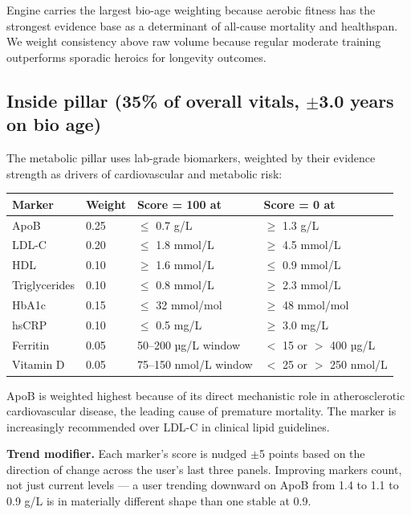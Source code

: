 \documentclass[11pt, a4paper]{article}
\begin{document}
Engine carries the largest bio-age weighting because aerobic fitness has the strongest evidence base as a determinant of all-cause mortality and healthspan. We weight consistency above raw volume because regular moderate training outperforms sporadic heroics for longevity outcomes.

\subsection{Inside pillar (35\% of overall vitals, $\pm$3.0 years on bio age)}

The metabolic pillar uses lab-grade biomarkers, weighted by their evidence strength as drivers of cardiovascular and metabolic risk:

\vspace{0.3em}
\noindent
\begin{tabularx}{\linewidth}{@{} L{2.5cm} L{1.4cm} X X @{}}
\toprule
\textbf{Marker} & \textbf{Weight} & \textbf{Score = 100 at} & \textbf{Score = 0 at} \\
\midrule
ApoB & 0.25 & $\leq$ 0.7 g/L & $\geq$ 1.3 g/L \\
LDL-C & 0.20 & $\leq$ 1.8 mmol/L & $\geq$ 4.5 mmol/L \\
HDL & 0.10 & $\geq$ 1.6 mmol/L & $\leq$ 0.9 mmol/L \\
Triglycerides & 0.10 & $\leq$ 0.8 mmol/L & $\geq$ 2.3 mmol/L \\
HbA1c & 0.15 & $\leq$ 32 mmol/mol & $\geq$ 48 mmol/mol \\
hsCRP & 0.10 & $\leq$ 0.5 mg/L & $\geq$ 3.0 mg/L \\
Ferritin & 0.05 & 50--200 µg/L window & $<$ 15 or $>$ 400 µg/L \\
Vitamin D & 0.05 & 75--150 nmol/L window & $<$ 25 or $>$ 250 nmol/L \\
\bottomrule
\end{tabularx}
\vspace{0.5em}

ApoB is weighted highest because of its direct mechanistic role in atherosclerotic cardiovascular disease, the leading cause of premature mortality. The marker is increasingly recommended over LDL-C in clinical lipid guidelines.

\textbf{Trend modifier.} Each marker's score is nudged $\pm$5 points based on the direction of change across the user's last three panels. Improving markers count, not just current levels --- a user trending downward on ApoB from 1.4 to 1.1 to 0.9 g/L is in materially different shape than one stable at 0.9.
\end{document}
